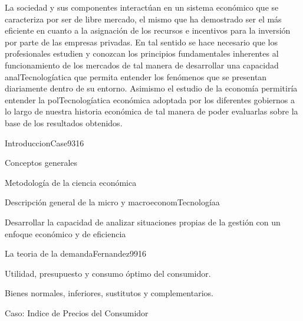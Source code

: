 \begin{syllabus}


\begin{justification}
La sociedad y sus componentes interactúan en un sistema económico que se caracteriza por ser de libre mercado, el mismo que ha demostrado ser el más eficiente en cuanto a la asignación de los recursos e incentivos para la inversión por parte de las empresas privadas. En tal sentido se hace necesario que los profesionales estudien y conozcan los principios fundamentales inherentes al funcionamiento de los mercados de tal manera de desarrollar una capacidad analTecnologíatica que permita entender los fenómenos que se presentan diariamente dentro de su entorno. Asimismo el estudio de la economía permitiría entender la polTecnologíatica económica adoptada por los diferentes gobiernos a lo largo de nuestra historia económica de tal manera de poder evaluarlas sobre la base de los resultados obtenidos.
\end{justification}

\begin{goals}
\item \OutcomeHU
\end{goals}

\begin{outcomes}
\end{outcomes}

\begin{unit}{Introduccion}{Case93}{16}
\begin{topics}
	\item Conceptos generales
	\item Metodología de la ciencia económica
	\item Descripción general de la micro y macroeconomTecnologíaa
\end{topics}

\begin{unitgoals}
      \item Desarrollar la capacidad de analizar situaciones propias de la gestión con un enfoque económico y de eficiencia
   \end{unitgoals}
\end{unit}

\begin{unit}{La teoria de la demanda}{Fernandez99}{16}
\begin{topics}
	\item  Utilidad, presupuesto y consumo óptimo del consumidor.
	\item Bienes normales, inferiores, sustitutos y complementarios.
 	\item Caso: Indice de Precios del Consumidor
\end{topics}


\end{unit}
\end{syllabus}
